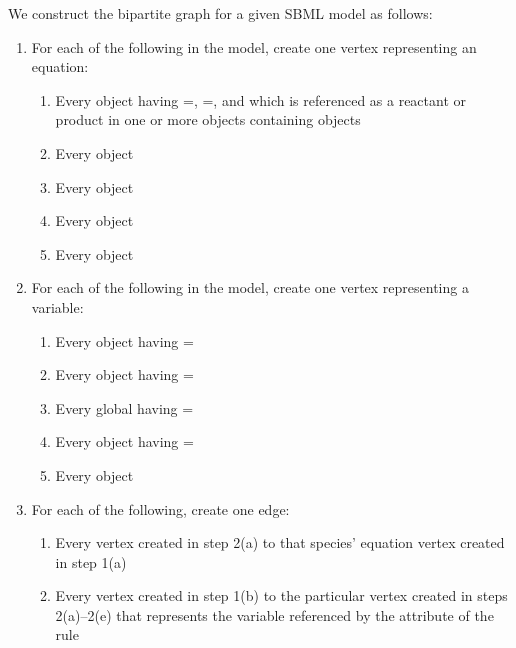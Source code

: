 We construct the bipartite graph for a given SBML model as follows:
\begin{enumerate}

\item For each of the following in the model, create one vertex
  representing an equation:
  \begin{enumerate}
    
  \item Every \Species object having
    =,
    =, and which is referenced as a
    reactant or product in one or more \Reaction objects
    containing \KineticLaw objects

  \item Every \AssignmentRule object

  \item Every \RateRule object

  \item Every \AlgebraicRule object

  \item Every \KineticLaw object

  \end{enumerate}
  
\item For each of the following in the model, create one vertex
  representing a variable:
  \begin{enumerate}

  \item Every \Species object having =
  \item Every \Compartment object having =
  \item Every global \Parameter having =
  \item Every \SpeciesReference object having =
  \item Every \Reaction object

  \end{enumerate}
  
\item For each of the following, create one edge:
  \begin{enumerate}
    
  \item Every vertex created in step 2(a) to that species'
    equation vertex created in step 1(a)
    
  \item Every vertex created in step 1(b) to the particular vertex
    created in steps 2(a)--2(e) that represents the variable
    referenced by the  attribute of the rule
    

\end{enumerate}
\end{enumerate}
